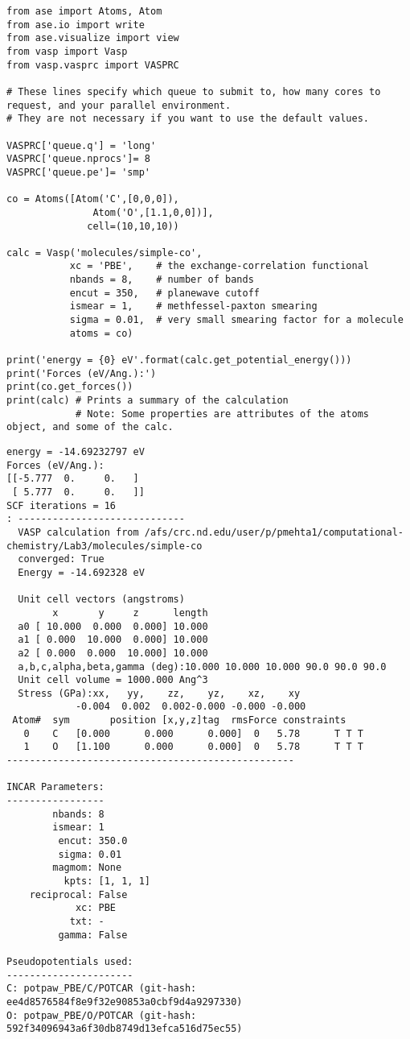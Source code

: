 \documentclass[11pt]{article}
\begin{document}
\begin{verbatim}
from ase import Atoms, Atom
from ase.io import write
from ase.visualize import view
from vasp import Vasp
from vasp.vasprc import VASPRC

# These lines specify which queue to submit to, how many cores to request, and your parallel environment.
# They are not necessary if you want to use the default values.

VASPRC['queue.q'] = 'long'
VASPRC['queue.nprocs']= 8
VASPRC['queue.pe']= 'smp'

co = Atoms([Atom('C',[0,0,0]),
               Atom('O',[1.1,0,0])],
              cell=(10,10,10))

calc = Vasp('molecules/simple-co',
           xc = 'PBE',    # the exchange-correlation functional
           nbands = 8,    # number of bands
           encut = 350,   # planewave cutoff
           ismear = 1,    # methfessel-paxton smearing
           sigma = 0.01,  # very small smearing factor for a molecule
           atoms = co)

print('energy = {0} eV'.format(calc.get_potential_energy()))
print('Forces (eV/Ang.):')
print(co.get_forces())
print(calc) # Prints a summary of the calculation
            # Note: Some properties are attributes of the atoms object, and some of the calc. 
\end{verbatim}

\begin{verbatim}
energy = -14.69232797 eV
Forces (eV/Ang.):
[[-5.777  0.     0.   ]
 [ 5.777  0.     0.   ]]
SCF iterations = 16
: -----------------------------
  VASP calculation from /afs/crc.nd.edu/user/p/pmehta1/computational-chemistry/Lab3/molecules/simple-co
  converged: True
  Energy = -14.692328 eV

  Unit cell vectors (angstroms)
        x       y     z      length
  a0 [ 10.000  0.000  0.000] 10.000
  a1 [ 0.000  10.000  0.000] 10.000
  a2 [ 0.000  0.000  10.000] 10.000
  a,b,c,alpha,beta,gamma (deg):10.000 10.000 10.000 90.0 90.0 90.0
  Unit cell volume = 1000.000 Ang^3
  Stress (GPa):xx,   yy,    zz,    yz,    xz,    xy
            -0.004  0.002  0.002-0.000 -0.000 -0.000
 Atom#  sym       position [x,y,z]tag  rmsForce constraints
   0    C   [0.000      0.000      0.000]  0   5.78      T T T
   1    O   [1.100      0.000      0.000]  0   5.78      T T T
--------------------------------------------------

INCAR Parameters:
-----------------
        nbands: 8
        ismear: 1
         encut: 350.0
         sigma: 0.01
        magmom: None
          kpts: [1, 1, 1]
    reciprocal: False
            xc: PBE
           txt: -
         gamma: False

Pseudopotentials used:
----------------------
C: potpaw_PBE/C/POTCAR (git-hash: ee4d8576584f8e9f32e90853a0cbf9d4a9297330)
O: potpaw_PBE/O/POTCAR (git-hash: 592f34096943a6f30db8749d13efca516d75ec55)
\end{verbatim}
\end{document}
